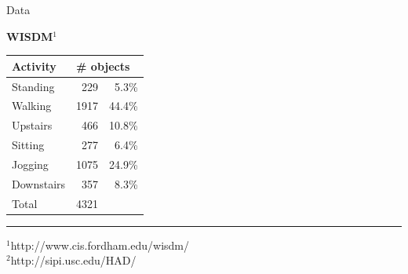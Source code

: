 \documentclass{beamer}
\begin{document}
\begin{frame}{Data}
\noindent
\begin{minipage}[t]{0.45\linewidth}
	\textbf{WISDM}$^1$
	\begin{table}[]
		\scriptsize
		\label{my-label}
		\begin{tabular}{l|rr}
			\hline
			\textbf{Activity}   & \multicolumn{2}{l}{\textbf{\# objects}} \\
			\hline
			Standing   & 229 & 5.3\% \\
			Walking    & 1917 & 44.4\%\\
			Upstairs   & 466 &10.8\%\\
			Sitting    & 277  &6.4\%\\
			Jogging    & 1075 &24.9\%\\
			Downstairs & 357 &8.3\%\\
			\hline
			Total & \multicolumn{2}{l}{4321}  \\
			\hline
		\end{tabular}
	\end{table}

	\vspace{1cm}
	\medskip\hrule\medskip
	{\scriptsize $^1$http://www.cis.fordham.edu/wisdm/ \\
		$^2$http://sipi.usc.edu/HAD/}
	

\end{minipage}
\end{frame}
\end{document}
